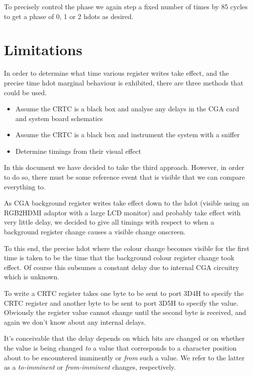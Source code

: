 \documentclass[a4paper,10pt]{amsart}
\begin{document}
To precisely control the phase we again step a fixed number of times by 85
cycles to get a phase of 0, 1 or 2 hdots as desired.

\section{Limitations}

In order to determine what time various register writes take effect, and the
precise time hdot marginal behaviour is exhibited, there are three methods that
could be used.

\begin{itemize}
\item Assume the CRTC is a black box and analyse any delays in the CGA card
and system board schematics
\item Assume the CRTC is a black box and instrument the system with a sniffer
\item Determine timings from their visual effect
\end{itemize}

In this document we have decided to take the third approach. However, in order
to do so, there must be some reference event that is visible that we can
compare everything to.

As CGA background register writes take effect down to the hdot (visible using
an RGB2HDMI adaptor with a large LCD monitor) and probably take effect with
very little delay, we decided to give all timings with respect to when a
background register change causes a visible change onscreen.

To this end, the precise hdot where the colour change becomes visible for the
first time is taken to be the time that the background colour register change
took effect. Of course this subsumes a constant delay due to internal CGA
circuitry which is unknown.

To write a CRTC register takes one byte to be sent to port 3D4H to specify the
CRTC register and another byte to be sent to port 3D5H to specify the value.
Obviously the register value cannot change until the second byte is received,
and again we don't know about any internal delays.

It's conceivable that the delay depends on which bits are changed or on whether
the value is being changed \emph{to} a value that corresponds to a character
position about to be encountered imminently or \emph{from} such a value. We
refer to the latter as a \emph{to-imminent} or \emph{from-imminent} changes,
respectively.
\end{document}
